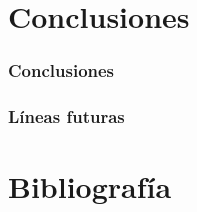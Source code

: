 \documentclass{report}
\begin{document}

\chapter{Conclusiones}
\subsection{Conclusiones}
\subsection{Líneas futuras}



\chapter{Bibliografía}
\end{document}
